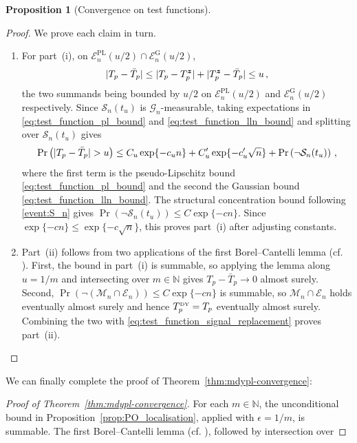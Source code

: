 \documentclass{article}
\makeatletter
\newtheorem{proposition}[theorem]{Proposition}
\theoremstyle{definition}
\newcommand{\abs}[1]{%
	\ensuremath{%
		\if@display
		\left| #1 \right|
		\else
		\lvert #1 \rvert
		\fi
	}%
}
\newcommand*{\bb}{\boldsymbol}
\makeatother
\begin{document}
\begin{bibunit}
\begin{proposition}[Convergence on test functions]
\end{proposition}

\begin{proof}
    We prove each claim in turn. 
    \begin{enumerate}[label=(\roman*)]
        \item For part~(i), on
$\mathcal E_n^{\mathrm{PL}}(u/2)\cap\mathcal E_n^{\mathrm{G}}(u/2)$,
$$
    \abs{
        T_p-\bar T_p
    }
    \leq
    \abs{T_p-T_p^{\bb z}}
    +
    \abs{T_p^{\bb z}-\bar T_p}
    \leq
    u\,,
$$
the two summands being bounded by $u/2$ on
$\mathcal E_n^{\mathrm{PL}}(u/2)$ and $\mathcal E_n^{\mathrm{G}}(u/2)$
respectively. Since $\mathcal S_n(t_u)$ is
$\mathcal G_n$-measurable, taking expectations in
\eqref{eq:test_function_pl_bound} and
\eqref{eq:test_function_lln_bound} and splitting over
$\mathcal S_n(t_u)$ gives
$$
    \Pr
    \left(
        \abs{
            T_p-\bar T_p
        }
        >
        u
    \right)
    \leq
    C_u\exp\{-c_un\}
    +
    C_u'\exp\{-c_u'\sqrt n\}
    +
    \Pr
    \left(
        \lnot\mathcal S_n(t_u)
    \right)\,,
$$
where the first term is the pseudo-Lipschitz bound
\eqref{eq:test_function_pl_bound} and the second the Gaussian bound
\eqref{eq:test_function_lln_bound}. The structural concentration bound
following \eqref{event:S_n} gives
$\Pr(\lnot\mathcal S_n(t_u))\leq C\exp\{-cn\}$. Since
$\exp\{-cn\}\leq\exp\{-c\sqrt n\}$, this proves part~(i) after
adjusting constants.
        \item Part~(ii) follows from two applications of the first Borel--Cantelli
lemma (cf. \citealt[p.~308]{shiryaev:2016}). First, the bound in
part~(i) is summable, so applying the lemma along $u=1/m$ and
intersecting over $m\in\mathbb N$ gives
$T_p-\bar T_p\to0$ almost surely. Second,
$\Pr(\lnot(\mathcal M_n\cap\mathcal E_n))\leq C\exp\{-cn\}$ is summable,
so $\mathcal M_n\cap\mathcal E_n$ holds eventually almost surely and
hence $T_p^{\textrm{\tiny DY}}=T_p$ eventually almost surely. Combining
the two with \eqref{eq:test_function_signal_replacement} proves
part~(ii).
\end{enumerate}
\end{proof}
We can finally complete the proof of Theorem~\ref{thm:mdypl-convergence}:
\begin{proof}[Proof of Theorem~\ref{thm:mdypl-convergence}]
For each $m\in\mathbb N$, the unconditional bound in
Proposition~\ref{prop:PO_localisation}, applied with $\epsilon=1/m$,
is summable. The first Borel--Cantelli lemma
(cf. \citealt[p.~308]{shiryaev:2016}), followed by intersection over

\end{proof}
\end{bibunit}
\end{document}
